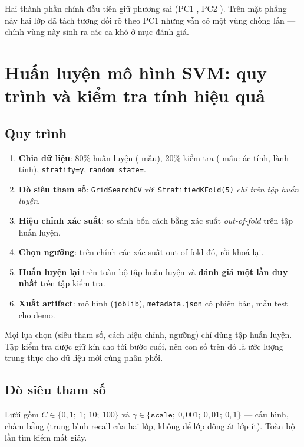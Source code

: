 \documentclass[12pt]{article}
\begin{document}
Hai thành phần chính đầu tiên giữ \PcaTotal{} phương sai (PC1 \PcaOne, PC2 \PcaTwo). Trên mặt phẳng này hai lớp đã
tách tương đối rõ theo PC1 nhưng vẫn có một vùng chồng lấn --- chính vùng này sinh ra các ca khó ở mục đánh giá.

\section{Huấn luyện mô hình SVM: quy trình và kiểm tra tính hiệu quả}

\subsection{Quy trình}
\begin{enumerate}
  \item \textbf{Chia dữ liệu}: 80\% huấn luyện (\NTrain{} mẫu), 20\% kiểm tra (\NTest{} mẫu: \TestMalignant{} ác tính,
        \TestBenign{} lành tính), \texttt{stratify=y}, \texttt{random\_state=\RandomState}.
  \item \textbf{Dò siêu tham số}: \texttt{GridSearchCV} với \texttt{StratifiedKFold(5)} \emph{chỉ trên tập huấn luyện}.
  \item \textbf{Hiệu chỉnh xác suất}: so sánh bốn cách bằng xác suất \emph{out-of-fold} trên tập huấn luyện.
  \item \textbf{Chọn ngưỡng}: trên chính các xác suất out-of-fold đó, rồi khoá lại.
  \item \textbf{Huấn luyện lại} trên toàn bộ tập huấn luyện và \textbf{đánh giá một lần duy nhất} trên tập kiểm tra.
  \item \textbf{Xuất artifact}: mô hình (\texttt{joblib}), \texttt{metadata.json} có phiên bản, mẫu test cho demo.
\end{enumerate}

Mọi lựa chọn (siêu tham số, cách hiệu chỉnh, ngưỡng) chỉ dùng tập huấn luyện. Tập kiểm tra được giữ kín cho tới
bước cuối, nên con số trên đó là ước lượng trung thực cho dữ liệu mới cùng phân phối.

\subsection{Dò siêu tham số}
Lưới gồm $C \in \{0{,}1;\ 1;\ 10;\ 100\}$ và $\gamma \in \{\texttt{scale};\ 0{,}001;\ 0{,}01;\ 0{,}1\}$ --- \GridConfigs{}
cấu hình, chấm bằng \GridScoring{} (trung bình recall của hai lớp, không để lớp đông át lớp ít). Toàn bộ lần tìm
kiếm mất \GridSeconds{} giây.
\end{document}

